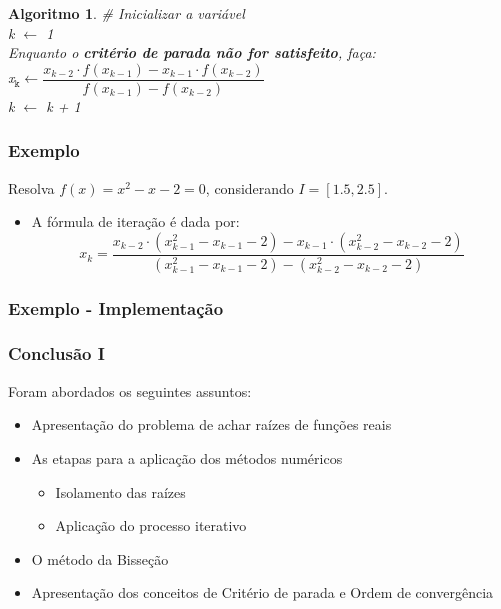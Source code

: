 \documentclass{beamer}
\theoremstyle{mystyle}
\newtheorem{algoritmo}[theorem]{Algoritmo}
\begin{document}
\begin{frame}
	\begin{algoritmo}
		\# Inicializar a variável\\
		k $\leftarrow$ 1 \\
		Enquanto o \textbf{critério de parada não for satisfeito}, faça:\\
		\quad x$ _{\texttt{k}} \leftarrow \dfrac{x_{k - 2} \cdot f(x_{k - 1}) - x_{k - 1} \cdot f(x_{k - 2})}{f(x_{k - 1}) - f(x_{k - 2}) } $ \\
		\quad k $\leftarrow$ k + 1
	\end{algoritmo}
\end{frame}

\begin{frame}
	\frametitle{Exemplo}
	Resolva $ f (x) = x^{2} - x - 2 = 0 $, considerando $ I = [1.5, 2.5] $.
	\pause
	
	\begin{itemize}
		\item A fórmula de iteração é dada por:
		\begin{equation*}
			x_{k} =\frac{x_{k - 2} \cdot (x_{k - 1}^{2} - x_{k - 1} - 2) - x_{k - 1} \cdot (x_{k- 2}^{2} - x_{k - 2} - 2)}{(x_{k - 1}^{2} - x_{k - 1} - 2) - (x_{k - 2}^{2} - x_{k - 2} - 2)}
		\end{equation*}
	\end{itemize}
\end{frame}

\begin{frame}
	\frametitle{Exemplo - Implementação}
	\centering
	\href{https://colab.research.google.com/drive/1vZgdMgXO5qvClp5dK3kR-Qs4BnWPkcu2?usp=sharing}{}
\end{frame}

\begin{frame}
	\frametitle{Conclusão I}	
	Foram abordados os seguintes assuntos:
	\begin{itemize}
		\item Apresentação do problema de achar raízes de funções reais
		\item As etapas para a aplicação dos métodos numéricos
		\begin{itemize}
			\item Isolamento das raízes
			\item Aplicação do processo iterativo
		\end{itemize}
		\item O método da Bisseção
		\item Apresentação dos conceitos de Critério de parada e Ordem de convergência
	\end{itemize}
\end{frame}
\end{document}
